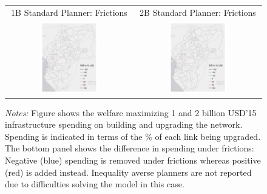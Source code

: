 \documentclass[a4paper]{article}
\begin{document}
\begin{figure}[H]
{\begin{tabular}{cc}
1B Standard Planner: Frictions & 2B Standard Planner: Frictions \\
\includegraphics[width=0.48\textwidth]{"../figures/GE/trans_africa_network_GE_add_20g_1b_fixed_cgc_sigma3.8_rho0_julia_google_Ijk_bc_perc_ug_diff.pdf"} &
\includegraphics[width=0.48\textwidth]{"../figures/GE/trans_africa_network_GE_add_20g_2b_fixed_cgc_sigma3.8_rho0_julia_google_Ijk_bc_perc_ug_diff.pdf"}
\end{tabular}
}
\raggedright
\scriptsize 
\emph{Notes:} Figure shows the welfare maximizing 1 and 2 billion USD'15 infrastructure spending on building and upgrading the network. Spending is indicated in terms of the \% of each link being upgraded. The bottom panel shows the difference in spending under frictions: Negative (blue) spending is removed under frictions whereas positive (red) is added instead. Inequality averse planners are not reported due to difficulties solving the model in this case. %
\end{figure}
\end{document}
